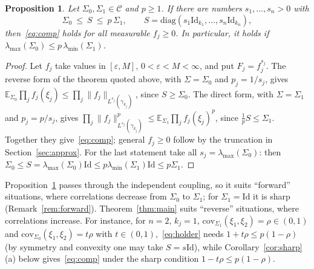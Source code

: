 \documentclass[11pt]{amsart}
\newtheorem{proposition}[theorem]{Proposition}
\theoremstyle{definition}
\newcommand{\E}{\mathbb{E}}
\newcommand{\Id}{\mathrm{Id}}
\begin{document}
\begin{proposition}\label{prop:holder}
Let $\Sigma_0,\Sigma_1\in\mathcal C$ and $p\ge1$. If there are numbers $s_1,\dots,s_n>0$ with
\begin{equation}\label{eq:holder}
\Sigma_0\ \le\ S\ \le\ p\,\Sigma_1,\qquad S=\mathrm{diag}(s_1\Id_{k_1},\dots,s_n\Id_{k_n}),
\end{equation}
then~\eqref{eq:comp} holds for all measurable $f_j\ge0$. In particular, it holds if
$\lambda_{\max}(\Sigma_0)\le p\,\lambda_{\min}(\Sigma_1)$.
\end{proposition}

\begin{proof}
Let $f_j$ take values in $[\varepsilon,M]$, $0<\varepsilon<M<\infty$, and put $F_j=f_j^{s_j}$. The reverse form of the
theorem quoted above, with $\Sigma=\Sigma_0$ and $p_j=1/s_j$, gives
$\E_{\Sigma_0}\prod_jf_j(\xi_j)\le\prod_j\|f_j\|_{L^{s_j}(\gamma_{k_j})}$, since $S\ge\Sigma_0$. The direct form, with
$\Sigma=\Sigma_1$ and $p_j=p/s_j$, gives $\prod_j\|f_j\|_{L^{s_j}(\gamma_{k_j})}^p\le\E_{\Sigma_1}\prod_jf_j(\xi_j)^p$,
since $\frac1pS\le\Sigma_1$. Together they give~\eqref{eq:comp}; general $f_j\ge0$ follow by the truncation in
Section~\ref{sec:approx}. For the last statement take all $s_j=\lambda_{\max}(\Sigma_0)$: then
$\Sigma_0\le S=\lambda_{\max}(\Sigma_0)\Id\le p\lambda_{\min}(\Sigma_1)\Id\le p\Sigma_1$.
\end{proof}

Proposition~\ref{prop:holder} passes through the independent coupling, so it suits ``forward'' situations, where
correlations decrease from $\Sigma_0$ to $\Sigma_1$; for $\Sigma_1=\Id$ it is sharp (Remark~\ref{rem:forward}).
Theorem~\ref{thm:main} suits ``reverse'' situations, where correlations increase. For instance, for $n=2$, $k_j=1$,
$\mathrm{cov}_{\Sigma_1}(\xi_1,\xi_2)=\rho\in(0,1)$ and $\mathrm{cov}_{\Sigma_0}(\xi_1,\xi_2)=t\rho$ with
$t\in(0,1)$,~\eqref{eq:holder} needs $1+t\rho\le p(1-\rho)$ (by symmetry and convexity one may take $S=s\Id$), while
Corollary~\ref{cor:sharp}(a) below gives~\eqref{eq:comp} under the sharp condition $1-t\rho\le p(1-\rho)$.
\end{document}
